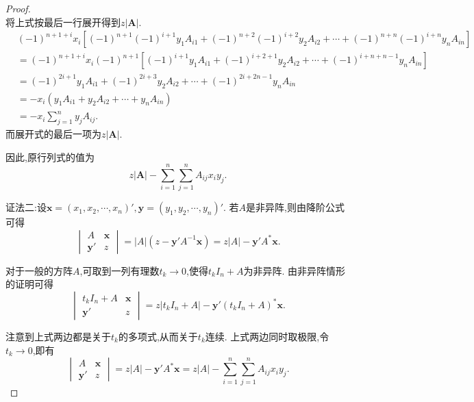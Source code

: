 \documentclass[../../main.tex]{subfiles}%
\begin{document}
\begin{proof}
\begin{equation}
\nonumber
\end{equation}
将上式按最后一行展开得到$z\left|\boldsymbol{A}\right|$.
\begin{equation}
\begin{split}
&\left( -1 \right) ^{n+1+i}x_i\left[ \left( -1 \right) ^{n+1}\left( -1 \right) ^{i+1}y_1A_{i1}+\left( -1 \right) ^{n+2}\left( -1 \right) ^{i+2}y_2A_{i2}+\cdots +\left( -1 \right) ^{n+n}\left( -1 \right) ^{i+n}y_nA_{in} \right] 
\\
&=\left( -1 \right) ^{n+1+i}x_i\left( -1 \right) ^{n+1}\left[ \left( -1 \right) ^{i+1}y_1A_{i1}+\left( -1 \right) ^{i+2+1}y_2A_{i2}+\cdots +\left( -1 \right) ^{i+n+n-1}y_nA_{in} \right] 
\\
&=\left( -1 \right) ^{2i+1}y_1A_{i1}+\left( -1 \right) ^{2i+3}y_2A_{i2}+\cdots +\left( -1 \right) ^{2i+2n-1}y_nA_{in}
\\
&=-x_i\left( y_1A_{i1}+y_2A_{i2}+\cdots +y_nA_{in} \right) 
\\
&=-x_i\sum_{j=1}^n{y_jA_{ij}.}
\end{split}
\nonumber
\end{equation}
而展开式的最后一项为$z\left|\boldsymbol{A}\right|$.

因此,原行列式的值为
\begin{equation}
z|\boldsymbol{A}|-\sum_{i=1}^n{\sum_{j=1}^n{A_{ij}x_iy_j.}}
\nonumber
\end{equation}

{\color{blue}证法二:}设\(\boldsymbol{x}=(x_1,x_2,\cdots,x_n)',\boldsymbol{y}=(y_1,y_2,\cdots,y_n)'\). 若\(A\)是非异阵,则由降阶公式可得
\[
\begin{vmatrix}
A & \boldsymbol{x}\\
\boldsymbol{y}' & z
\end{vmatrix}=|A|(z - \boldsymbol{y}'A^{-1}\boldsymbol{x})=z|A| - \boldsymbol{y}'A^*\boldsymbol{x}.
\]

对于一般的方阵\(A\),可取到一列有理数\(t_k\rightarrow0\),使得\(t_kI_n + A\)为非异阵. 由非异阵情形的证明可得
\[
\begin{vmatrix}
t_kI_n + A & \boldsymbol{x}\\
\boldsymbol{y}' & z
\end{vmatrix}=z|t_kI_n + A| - \boldsymbol{y}'(t_kI_n + A)^*\boldsymbol{x}.
\]

注意到上式两边都是关于\(t_k\)的多项式,从而关于\(t_k\)连续. 上式两边同时取极限,令\(t_k\rightarrow0\),即有
\[
\begin{vmatrix}
A & \boldsymbol{x}\\
\boldsymbol{y}' & z
\end{vmatrix}=z|A| - \boldsymbol{y}'A^*\boldsymbol{x}=z|A|-\sum_{i = 1}^{n}\sum_{j = 1}^{n}A_{ij}x_iy_j.
\]
\end{proof}
\end{document}
